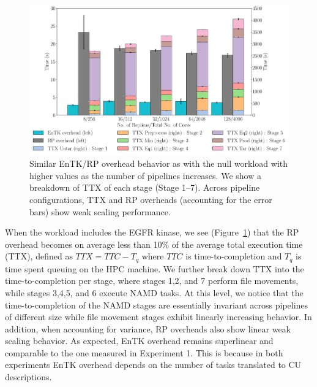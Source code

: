 

\begin{figure}
  \centering
  \includegraphics[width=\columnwidth]{esmacs_32.pdf}
  \caption{Similar EnTK/RP overhead behavior as with the null workload with higher
  values as the number of pipelines increases. We show a breakdown of TTX of
  each stage (Stage 1--7). Across pipeline configurations, TTX and RP
  overheads (accounting for the error bars) show weak scaling
  performance.}\label{fig:exp2}
\end{figure}


When the workload includes the EGFR kinase, we see (Figure~\ref{fig:exp2})
that the RP overhead becomes on average less than 10\% of the average total
execution time (TTX), defined as \(TTX = TTC - T_q\) where \(TTC\) is
time-to-completion and \(T_q\) is time spent queuing on the HPC machine. We
further break down TTX into the time-to-completion per stage, where stages
1,2, and 7 perform file movements, while stages 3,4,5, and 6 execute NAMD
tasks. At this level, we notice that the time-to-completion of the NAMD
stages are essentially invariant across pipelines of different size while
file movement stages exhibit linearly increasing behavior. In addition, when
accounting for variance, RP overheads also show linear weak scaling behavior.
As expected, EnTK overhead remains superlinear and comparable to the one
measured in Experiment 1. This is because in both experiments EnTK overhead
depends on the number of tasks translated to CU descriptions.


